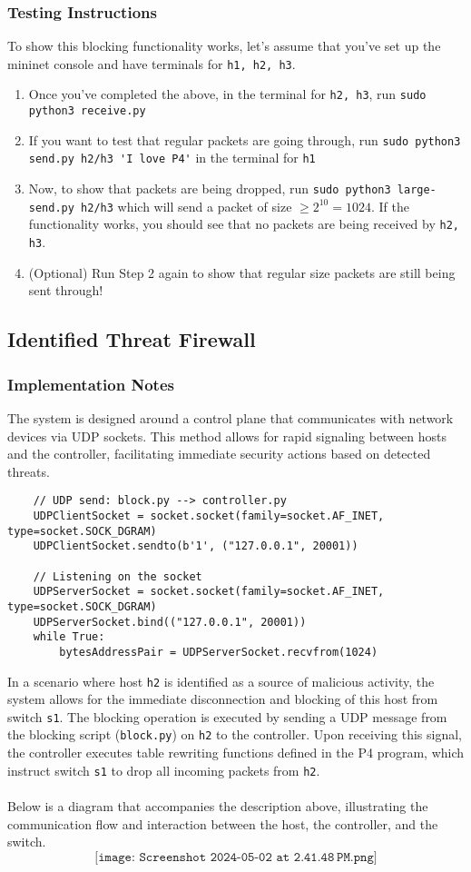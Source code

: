 \subsubsection{Testing Instructions}
To show this blocking functionality works, let's assume that you've set up the mininet console and have terminals for \verb|h1, h2, h3|.
\begin{enumerate}
    \item Once you've completed the above, in the terminal for \verb|h2, h3|, run \verb|sudo python3 receive.py|
    \item If you want to test that regular packets are going through, run \verb|sudo python3 send.py h2/h3 'I love P4'| in the terminal for \verb|h1|
    \item Now, to show that packets are being dropped, run \verb|sudo python3 large-send.py h2/h3| which will send a packet of size $\geq 2^{10} = 1024$. If the functionality works, you should see that no packets are being received by \verb|h2, h3|.
    \item (Optional) Run Step 2 again to show that regular size packets are still being sent through!
\end{enumerate}
\subsection{Identified Threat Firewall}
\subsubsection{Implementation Notes}
The system is designed around a control plane that communicates with network devices via UDP sockets. This method allows for rapid signaling between hosts and the controller, facilitating immediate security actions based on detected threats.
\begin{lstlisting}
    // UDP send: block.py --> controller.py
    UDPClientSocket = socket.socket(family=socket.AF_INET, type=socket.SOCK_DGRAM)
    UDPClientSocket.sendto(b'1', ("127.0.0.1", 20001))
    
    // Listening on the socket
    UDPServerSocket = socket.socket(family=socket.AF_INET, type=socket.SOCK_DGRAM)
    UDPServerSocket.bind(("127.0.0.1", 20001))
    while True:
        bytesAddressPair = UDPServerSocket.recvfrom(1024)
\end{lstlisting}
In a scenario where host \verb|h2| is identified as a source of malicious activity, the system allows for the immediate disconnection and blocking of this host from switch \verb|s1|. The blocking operation is executed by sending a UDP message from the blocking script (\verb|block.py|) on \verb|h2| to the controller. Upon receiving this signal, the controller executes table rewriting functions defined in the P4 program, which instruct switch \verb|s1| to drop all incoming packets from \verb|h2|.\\
\\
Below is a diagram that accompanies the description above, illustrating the communication flow and interaction between the host, the controller, and the switch.
$$
\texttt{[image: Screenshot 2024-05-02 at 2.41.48 PM.png]}
$$
